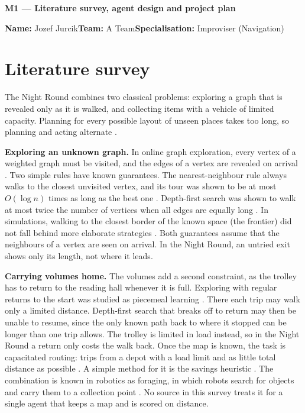 \documentclass[11pt,a4paper]{article}
\newcommand\myname{Jozef Jurcik}
\newcommand\myteam{A Team}
\newcommand\lead[1]{\vspace{-\parskip}\textbf{#1}}
\begin{document}
{\Large\bfseries M1 — Literature survey, agent design and project plan}\par\medskip
\textbf{Name:} \myname \quad \textbf{Team:} \myteam \quad \textbf{Specialisation:} Improviser
(Navigation)\par\medskip

\section{Literature survey}\label{sec:survey}

The Night Round combines two classical problems: exploring a graph that is revealed only as it is walked, and
collecting items with a vehicle of limited capacity. Planning for every possible layout of unseen places
takes too long, so planning and acting alternate \parencite{koenig2001agent}.

\lead{Exploring an unknown graph.} In online graph exploration, every vertex of a weighted graph must be visited, and the edges of a vertex are revealed on arrival \parencite{eberle2022robustification}. Two simple
rules have known guarantees. The nearest-neighbour rule always walks to the closest unvisited vertex, and its
tour was shown to be at most $O(\log n)$ times as long as the best one
\parencite{eberle2022robustification,rosenkrantz1977analysis}.
Depth-first search was shown to walk at most twice the number of vertices when all edges are equally long
\parencite{koenig2003performance}. In simulations, walking to the closest border of the known space (the
frontier) did not fall behind more elaborate strategies \parencite{holz2010evaluating}. Both guarantees assume that the neighbours of a vertex are seen on arrival. In the Night Round, an untried
exit shows only its length, not where it leads.

\lead{Carrying volumes home.} The volumes add a second constraint, as the trolley has to return to the reading hall whenever it is full. Exploring with regular returns to the start was studied as piecemeal learning \parencite{betke1995piecemeal}. There each trip may walk only a limited distance. Depth-first search that breaks off to return may then be unable to resume, since the only known path back to where it stopped can be longer than one trip allows. The trolley is limited in load instead, so in the Night Round a return only costs the walk back. Once the map is known, the task is capacitated routing: trips from a depot with a load limit and as little total distance as possible \parencite{haimovich1985bounds}. A simple method for it is the savings heuristic \parencite{clarke1964scheduling}. The combination is known in robotics as foraging, in which robots search for objects and carry them to a collection point \parencite{winfield2009foraging}. No source in this survey treats it for a single agent that keeps a map and is scored on distance.
\end{document}
